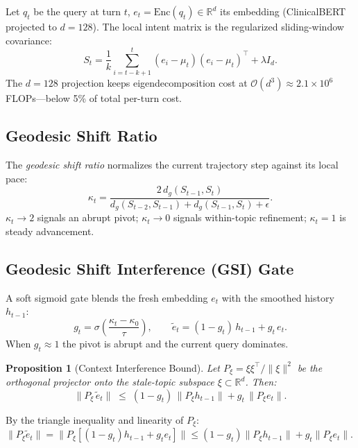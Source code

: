 \documentclass[journal,10pt,twoside]{IEEEtran}
\newtheorem{proposition}{Proposition}
\begin{document}
Let $q_t$ be the query at turn $t$, $e_t = \mathrm{Enc}(q_t) \in \mathbb{R}^d$ its embedding (ClinicalBERT projected to $d{=}128$). The local intent matrix is the regularized sliding-window covariance:
\begin{equation}
  S_t = \frac{1}{k}\sum_{i=t-k+1}^{t}(e_i-\mu_t)(e_i-\mu_t)^{\top} + \lambda I_d.
  \label{eq:spdintent}
\end{equation}
The $d{=}128$ projection keeps eigendecomposition cost at $\mathcal{O}(d^3){\approx}2.1{\times}10^6$ FLOPs---below 5\% of total per-turn cost.

\subsection{Geodesic Shift Ratio}

The \emph{geodesic shift ratio} normalizes the current trajectory step against its local pace:
\begin{equation}
  \kappa_t = \frac{2\,d_g(S_{t-1},S_t)}{d_g(S_{t-2},S_{t-1}) + d_g(S_{t-1},S_t) + \epsilon}.
  \label{eq:gsr}
\end{equation}
$\kappa_t{\to}2$ signals an abrupt pivot; $\kappa_t{\to}0$ signals within-topic refinement; $\kappa_t{=}1$ is steady advancement.

\subsection{Geodesic Shift Interference (GSI) Gate}

A soft sigmoid gate blends the fresh embedding $e_t$ with the smoothed history $h_{t-1}$:
\begin{equation}
  g_t = \sigma\!\left(\frac{\kappa_t - \kappa_0}{\tau}\right), \qquad
  \tilde{e}_t = (1-g_t)\,h_{t-1} + g_t\,e_t.
  \label{eq:gate}
\end{equation}
When $g_t{\approx}1$ the pivot is abrupt and the current query dominates.

\begin{proposition}[Context Interference Bound]
\label{prop:interference_bound}
Let $P_\xi = \xi\xi^\top/\|\xi\|^2$ be the orthogonal projector onto the stale-topic subspace $\xi \subset \mathbb{R}^d$. Then:
\begin{equation}
  \|P_\xi\,\tilde{e}_t\| \;\leq\; (1-g_t)\,\|P_\xi h_{t-1}\| + g_t\,\|P_\xi e_t\|.
  \label{eq:bound}
\end{equation}
\end{proposition}
\begin{IEEEproof}
By the triangle inequality and linearity of $P_\xi$:
$\|P_\xi\tilde{e}_t\| = \|P_\xi[(1{-}g_t)h_{t-1}{+}g_t e_t]\| \leq (1{-}g_t)\|P_\xi h_{t-1}\| + g_t\|P_\xi e_t\|.$
\end{IEEEproof}
\end{document}

